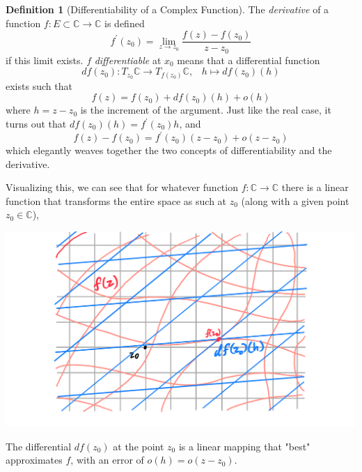\documentclass{article}
\theoremstyle{remark}
\theoremstyle{definition}
\newtheorem{definition}{Definition}[section]
\begin{document}
\begin{definition}[Differentiability of a Complex Function]
The \textit{derivative} of a function $f: E \subset \mathbb{C} \longrightarrow \mathbb{C}$ is defined
\[f^\prime (z_0) = \lim_{z \rightarrow z_0} \frac{f(z) - f(z_0)}{z - z_0}\]
if this limit exists. $f$ \textit{differentiable} at $x_0$ means that a differential function 
\[df(z_0): T_{z_0} \mathbb{C} \longrightarrow T_{f(z_0)} \mathbb{C}, \;\;\; h \mapsto df(z_0)(h)\]
exists such that
\[f(z) = f(z_0) + df(z_0)(h) + o(h)\]
where $h = z - z_0$ is the increment of the argument. Just like the real case, it turns out that $df(z_0)(h) = f^\prime (z_0) h$, and 
\[f(z) - f(z_0) = f^\prime(z_0) (z - z_0) + o(z - z_0)\]
which elegantly weaves together the two concepts of differentiability and the derivative. 

Visualizing this, we can see that for whatever function $f: \mathbb{C} \longrightarrow \mathbb{C}$ there is a linear function that transforms the entire space as such at $z_0$ (along with a given point $z_0 \in \mathbb{C}$), 
\begin{center}
    \includegraphics[scale=0.3]{img/Differential_of_Complex_Valued_Function.PNG}
\end{center}
The differential $df(z_0)$ at the point $z_0$ is a linear mapping that "best" approximates $f$, with an error of $o(h) = o(z - z_0)$. 
\end{definition}
\end{document}
